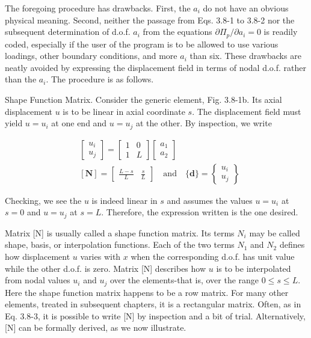 \documentclass[10pt]{article}
\begin{document}
The foregoing procedure has drawbacks. First, the $a_{i}$ do not have an obvious physical meaning. Second, neither the passage from Eqs. 3.8-1 to 3.8-2 nor the subsequent determination of d.o.f. $a_{i}$ from the equations $\partial \Pi_{p} / \partial a_{i}=0$ is readily coded, especially if the user of the program is to be allowed to use various loadings, other boundary conditions, and more $a_{i}$ than six. These drawbacks are neatly avoided by expressing the displacement field in terms of nodal d.o.f. rather than the $a_{i}$. The procedure is as follows.

Shape Function Matrix. Consider the generic element, Fig. 3.8-1b. Its axial displacement $u$ is to be linear in axial coordinate $s$. The displacement field must yield $u=u_{i}$ at one end and $u=u_{j}$ at the other. By inspection, we write

\begin{align*}
& {\begin{bmatrix}
u_{i} \\
u_{j}
\end{bmatrix}=\begin{bmatrix}
1 & 0 \\
1 & L
\end{bmatrix}\begin{bmatrix}
a_{1} \\
a_{2}
\end{bmatrix}} \\
& {[\mathbf{N}]=\begin{bmatrix}\frac{L-s}{L} & \frac{s}{L}\end{bmatrix} \quad \text{and} \quad\{\mathbf{d}\}=\begin{Bmatrix}
u_{i} \\
u_{j}
\end{Bmatrix}} \tag{3.8-4}
\end{align*}

Checking, we see the $u$ is indeed linear in $s$ and assumes the values $u=u_{i}$ at $s=0$ and $u=u_{j}$ at $s=L$. Therefore, the expression written is the one desired.

Matrix [N] is usually called a shape function matrix. Its terms $N_{i}$ may be called shape, basis, or interpolation functions. Each of the two terms $N_{1}$ and $N_{2}$ defines how displacement $u$ varies with $x$ when the corresponding d.o.f. has unit value while the other d.o.f. is zero. Matrix [N] describes how $u$ is to be interpolated from nodal values $u_{i}$ and $u_{j}$ over the elements-that is, over the range $0 \leqslant s \leqslant L$. Here the shape function matrix happens to be a row matrix. For many other elements, treated in subsequent chapters, it is a rectangular matrix. Often, as in Eq. 3.8-3, it is possible to write [N] by inspection and a bit of trial. Alternatively, [N] can be formally derived, as we now illustrate.
\end{document}
